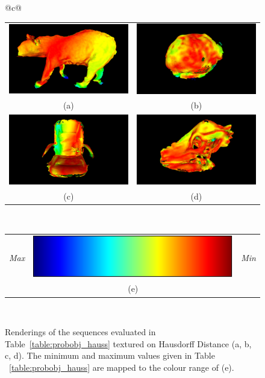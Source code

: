 \begin{figure}[!htbp]
  \centering
  \begin{tabular}{@{}c@{}}
    \begin{tabular}{cc}
      \includegraphics[width=.4\linewidth]{figures/object_recon/hauss/bear.png}&
      \includegraphics[width=.4\linewidth]{figures/object_recon/hauss/brain.png}\\
      (a) & (b) \\
      \includegraphics[width=.4\linewidth]{figures/object_recon/hauss/chair.png}&
      \includegraphics[width=.4\linewidth]{figures/object_recon/hauss/dino.png} \\
      (c) & (d) \\
    \end{tabular} \\
    \begin{tabular}{ccc}
      \textit{Max} & 
      \includegraphics[width=.3\linewidth]{figures/object_recon/hauss/colour_range.png} & 
      \textit{Min} \\
      & (e) & \\
    \end{tabular}
  \end{tabular}
  \caption[Probabilistic Object Reconstruction Hausdorff Distance]
  {Renderings of the sequences evaluated in Table~\ref{table:probobj_hauss} textured 
  on Hausdorff Distance (a, b, c, d). The minimum and maximum values given in Table 
~\ref{table:probobj_hauss} are mapped to the colour range of (e).}
~\label{figure:probobj_hauss}
\end{figure}

